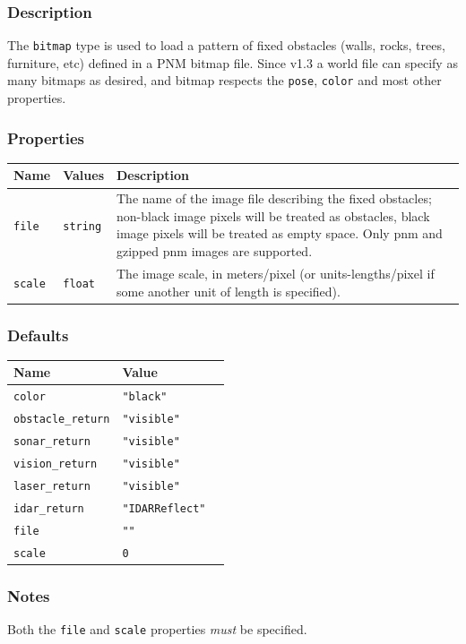 \documentclass[11pt,twoside]{report}
\begin{document}
\subsubsection*{Description}
The \verb'bitmap' type is used to load a pattern of fixed obstacles
(walls, rocks, trees, furniture, etc) defined in a PNM bitmap
file. Since v1.3 a world file can specify as many bitmaps as desired,
and bitmap respects the \verb'pose', \verb'color' and most other
properties. 

\subsubsection*{Properties}
\begin{tabularx}{\columnwidth}{llX}
\hline
Name & Values & Description \\
\hline

\verb'file' & \verb'string' & The name of the image file
describing the fixed obstacles; non-black image pixels will be treated
as obstacles, black image pixels will be treated as empty space.  Only
pnm and gzipped pnm images are supported.\\

\verb'scale' & \verb'float' & The image scale, in meters/pixel (or
units-lengths/pixel if some another unit of length is specified).\\

\hline
\end{tabularx}

\subsubsection*{Defaults}
\begin{tabularx}{\columnwidth}{llX}
\hline
Name & Value\\
\hline
\verb'color' & \verb'"black"'\\
\verb'obstacle_return' & \verb'"visible"'\\
\verb'sonar_return' & \verb'"visible"'\\
\verb'vision_return' & \verb'"visible"'\\
\verb'laser_return' & \verb'"visible"'\\
\verb'idar_return' & \verb'"IDARReflect"'\\
\verb'file' & \verb'""' \\
\verb'scale' & \verb'0' \\
\hline
\end{tabularx}

\subsubsection*{Notes}
Both the \verb'file' and \verb'scale' properties {\em must} be
specified.
\end{document}
